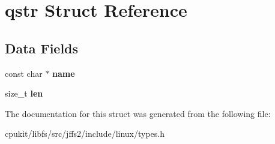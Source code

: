 \hypertarget{structqstr}{}\section{qstr Struct Reference}
\label{structqstr}
\subsection*{Data Fields}
\begin{DoxyCompactItemize}
\item 
\mbox{\label{structqstr_abbbf161a5f142aa39fd226dba51cca2f}} 
const char $\ast$ {\bfseries name}
\item 
\mbox{\label{structqstr_a3f73a9b7d648b7b979271ba814b4038a}} 
size\+\_\+t {\bfseries len}
\end{DoxyCompactItemize}


The documentation for this struct was generated from the following file\+:\begin{DoxyCompactItemize}
\item 
cpukit/libfs/src/jffs2/include/linux/types.\+h\end{DoxyCompactItemize}
